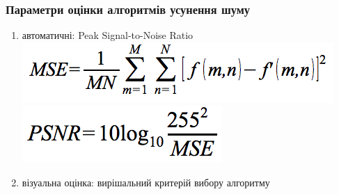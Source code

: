 \documentclass[12pt]{beamer}
\begin{document}
\begin{frame}\frametitle{Параметри оцінки алгоритмів усунення шуму}
	\begin{enumerate}
		\item автоматичні: Peak Signal-to-Noise Ratio \linebreak
		\includegraphics[scale=0.4]{images/mse} \linebreak
		\includegraphics[scale=0.4]{images/psnr} \linebreak
		\item візуальна оцінка: вирішальний критерій вибору алгоритму
	\end{enumerate}
\end{frame}
\end{document}

